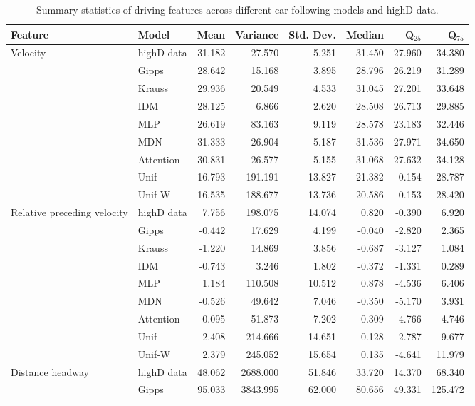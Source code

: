 \documentclass[journal]{IEEEtran}
\begin{document}
\begin{table}[th]
\centering
\caption{Summary statistics of driving features across different car-following models and highD data.}
\label{tab:highway_models_feature_stats}
\begin{tabular}{llrrrrrr}
\toprule
Feature & Model & Mean & Variance & Std. Dev. & Median & Q$_{25}$ & Q$_{75}$ \\
\midrule
\multirow{9}{*}{Velocity}
 & highD data & 31.182 & 27.570 & 5.251 & 31.450 & 27.960 & 34.380 \\
 & Gipps & 28.642 & 15.168 & 3.895 & 28.796 & 26.219 & 31.289 \\
 & Krauss & 29.936 & 20.549 & 4.533 & 31.045 & 27.201 & 33.648 \\
 & IDM & 28.125 & 6.866 & 2.620 & 28.508 & 26.713 & 29.885 \\
 & MLP & 26.619 & 83.163 & 9.119 & 28.578 & 23.183 & 32.446 \\
 & MDN & 31.333 & 26.904 & 5.187 & 31.536 & 27.971 & 34.650 \\
 & Attention & 30.831 & 26.577 & 5.155 & 31.068 & 27.632 & 34.128 \\
 & Unif & 16.793 & 191.191 & 13.827 & 21.382 & 0.154 & 28.787 \\
 & Unif-W & 16.535 & 188.677 & 13.736 & 20.586 & 0.153 & 28.420 \\
\midrule
\multirow{9}{*}{Relative preceding velocity}
 & highD data & 7.756 & 198.075 & 14.074 & 0.820 & -0.390 & 6.920 \\
 & Gipps & -0.442 & 17.629 & 4.199 & -0.040 & -2.820 & 2.365 \\
 & Krauss & -1.220 & 14.869 & 3.856 & -0.687 & -3.127 & 1.084 \\
 & IDM & -0.743 & 3.246 & 1.802 & -0.372 & -1.331 & 0.289 \\
 & MLP & 1.184 & 110.508 & 10.512 & 0.878 & -4.536 & 6.406 \\
 & MDN & -0.526 & 49.642 & 7.046 & -0.350 & -5.170 & 3.931 \\
 & Attention & -0.095 & 51.873 & 7.202 & 0.309 & -4.766 & 4.746 \\
 & Unif & 2.408 & 214.666 & 14.651 & 0.128 & -2.787 & 9.677 \\
 & Unif-W & 2.379 & 245.052 & 15.654 & 0.135 & -4.641 & 11.979 \\
\midrule
\multirow{9}{*}{Distance headway}
 & highD data & 48.062 & 2688.000 & 51.846 & 33.720 & 14.370 & 68.340 \\
 & Gipps & 95.033 & 3843.995 & 62.000 & 80.656 & 49.331 & 125.472 \\

\end{tabular}
\end{table}
\end{document}
